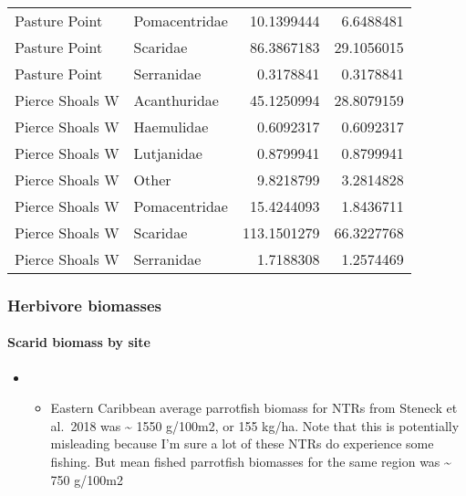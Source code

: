\documentclass[
]{article}
\providecommand{\tightlist}{%
  \setlength{\itemsep}{0pt}\setlength{\parskip}{0pt}}
\begin{document}
\begin{longtable}[]{@{}llrr@{}}
Pasture Point & Pomacentridae & 10.1399444 & 6.6488481 \\
Pasture Point & Scaridae & 86.3867183 & 29.1056015 \\
Pasture Point & Serranidae & 0.3178841 & 0.3178841 \\
Pierce Shoals W & Acanthuridae & 45.1250994 & 28.8079159 \\
Pierce Shoals W & Haemulidae & 0.6092317 & 0.6092317 \\
Pierce Shoals W & Lutjanidae & 0.8799941 & 0.8799941 \\
Pierce Shoals W & Other & 9.8218799 & 3.2814828 \\
Pierce Shoals W & Pomacentridae & 15.4244093 & 1.8436711 \\
Pierce Shoals W & Scaridae & 113.1501279 & 66.3227768 \\
Pierce Shoals W & Serranidae & 1.7188308 & 1.2574469 \\
\bottomrule()
\end{longtable}

\hypertarget{herbivore-biomasses}{%
\subsubsection{Herbivore biomasses}\label{herbivore-biomasses}}

\hypertarget{scarid-biomass-by-site}{%
\paragraph{Scarid biomass by site}\label{scarid-biomass-by-site}}

\begin{itemize}
\item
  \begin{itemize}
  \tightlist
  \item
    Eastern Caribbean average parrotfish biomass for NTRs from Steneck
    et al.~2018 was \textasciitilde{} 1550 g/100m2, or 155 kg/ha. Note
    that this is potentially misleading because I'm sure a lot of these
    NTRs do experience some fishing. But mean fished parrotfish
    biomasses for the same region was \textasciitilde{} 750 g/100m2
  \end{itemize}
\end{itemize}
\end{document}
